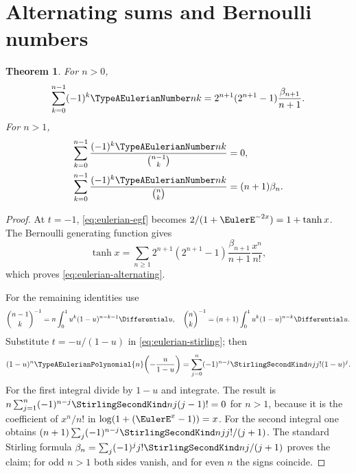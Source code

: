 \documentclass[11pt,a4paper,oneside,openany]{book}
\newtheorem{theorem}{Theorem}[chapter]
\theoremstyle{definition}
\theoremstyle{remark}
\begin{document}
\section{Alternating sums and Bernoulli numbers}
\begin{theorem}\label{thm:eulerian-alternating}
For $n>0$,
\begin{equation}\label{eq:eulerian-alternating}
 \sum_{k=0}^{n-1}(-1)^k\TypeAEulerianNumber nk
 =2^{n+1}(2^{n+1}-1)\frac{\beta_{n+1}}{n+1}.
\end{equation}
For $n>1$,
\begin{align}
 \sum_{k=0}^{n-1}\frac{(-1)^k\TypeAEulerianNumber nk}{\binom{n-1}{k}}&=0,
 \label{eq:eulerian-reciprocal-zero}\\
 \sum_{k=0}^{n-1}\frac{(-1)^k\TypeAEulerianNumber nk}{\binom nk}&=(n+1)\beta_n.
 \label{eq:eulerian-reciprocal-bernoulli}
\end{align}
\end{theorem}
\begin{proof}
At $t=-1$, \eqref{eq:eulerian-egf} becomes
$2/(1+\EulerE^{-2x})=1+\tanh x$.  The Bernoulli generating function gives
\[
 \tanh x=\sum_{n\ge1}
 2^{n+1}(2^{n+1}-1)\frac{\beta_{n+1}}{n+1}\frac{x^n}{n!},
\]
which proves \eqref{eq:eulerian-alternating}.

For the remaining identities use
\[
 \binom{n-1}{k}^{-1}=n\int_0^1u^k(1-u)^{n-k-1}\Differential u,
 \quad
 \binom nk^{-1}=(n+1)\int_0^1u^k(1-u)^{n-k}\Differential u.
\]
Substitute $t=-u/(1-u)$ in \eqref{eq:eulerian-stirling}; then
\begin{equation}\label{eq:eulerian-beta-transform}
 (1-u)^n\TypeAEulerianPolynomial{n}\!\left(-\frac{u}{1-u}\right)
 =\sum_{j=0}^{n}(-1)^{n-j}\StirlingSecondKind njj!(1-u)^j.
\end{equation}
For the first integral divide by $1-u$ and integrate.  The result is
$n\sum_{j=1}^n(-1)^{n-j}\StirlingSecondKind nj(j-1)!=0$ for $n>1$, because it is the
coefficient of $x^n/n!$ in
$\log(1+(\EulerE^x-1))=x$.  For the second integral one obtains
$(n+1)\sum_j(-1)^{n-j}\StirlingSecondKind njj!/(j+1)$.  The standard Stirling formula
$\beta_n=\sum_j(-1)^jj!\StirlingSecondKind nj/(j+1)$ proves the claim; for odd $n>1$ both
sides vanish, and for even $n$ the signs coincide.
\end{proof}
\end{document}

